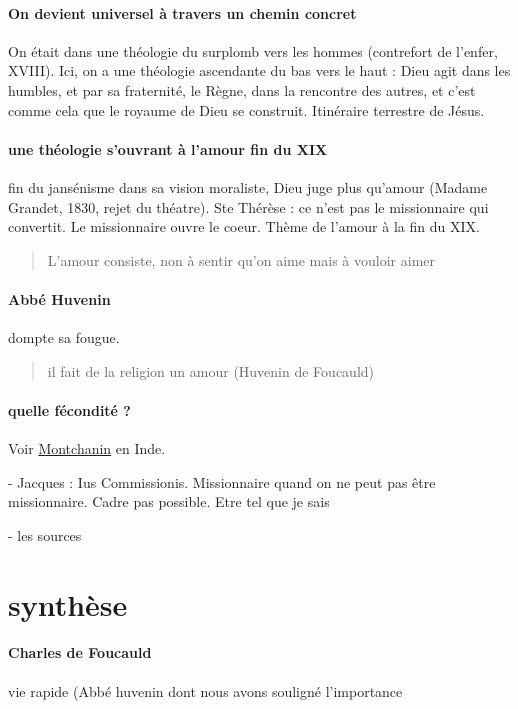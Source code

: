 \paragraph{On devient universel à travers un chemin concret} On était dans une théologie du surplomb vers les hommes (contrefort de l'enfer, XVIII). Ici, on a une théologie ascendante du bas vers le haut : Dieu agit dans les humbles, et par sa fraternité, le Règne, dans la rencontre des autres, et c'est comme cela que le royaume de Dieu se construit. Itinéraire terrestre de Jésus.

\paragraph{une théologie s'ouvrant à l'amour fin du XIX} fin du jansénisme dans sa vision moraliste, Dieu juge plus qu'amour (Madame Grandet, 1830, rejet du théatre). 
Ste Thérèse : ce n'est pas le missionnaire qui convertit. Le missionnaire ouvre le coeur. 
Thème de l'amour à la fin du XIX. 
\begin{quote}
    L'amour consiste, non à sentir qu'on aime mais à vouloir aimer 
\end{quote}


\paragraph{Abbé Huvenin} dompte sa fougue. 
\begin{quote}
    il fait de la religion un amour (Huvenin de Foucauld)
\end{quote}

\paragraph{quelle fécondité ?} Voir  \href{https://fr.wikipedia.org/wiki/Jules_Monchanin}{Montchanin} en Inde.



- Jacques : Ius Commissionis.  Missionnaire quand on ne peut pas être missionnaire. Cadre pas possible. Etre tel que je sais

- les sources

\section{synthèse}

\paragraph{Charles de Foucauld}
vie rapide (Abbé huvenin dont nous avons souligné l'importance


